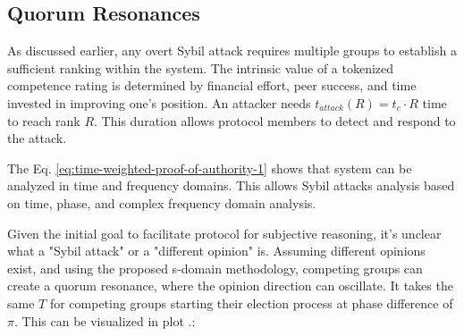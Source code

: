 \documentclass{article}
\begin{document}
\begin{CJK}{UTF8}{gbsn}
    \subsection{Quorum Resonances}
    \label{sec:time-constraint}

    As discussed earlier, any overt Sybil attack requires multiple groups to establish a sufficient ranking within the system. The intrinsic value of a tokenized competence rating is determined by financial effort, peer success, and time invested in improving one's position. An attacker needs $t_{attack}(R) = t_c \cdot R$ time to reach rank $R$. This duration allows protocol members to detect and respond to the attack.

    The Eq. \ref{eq:time-weighted-proof-of-authority-1} shows that system can be analyzed in time and frequency domains. This allows Sybil attacks analysis based on time, phase, and complex frequency domain analysis.

    Given the initial goal to facilitate protocol for subjective reasoning, it's unclear what a "Sybil attack" or a "different opinion" is. Assuming different opinions exist, and using the proposed s-domain methodology, competing groups can create a quorum resonance, where the opinion direction can oscillate. It takes the same $T$ for competing groups starting their election process at phase difference of $\pi$. This can be visualized in plot .:

    \begin{figure}[ht]
        \centering
\end{figure}
\end{CJK}
\end{document}
